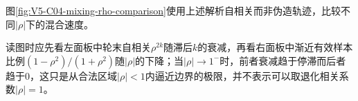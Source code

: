 \documentclass[UTF8,a4paper,11pt,openany]{ctexbook}
\begin{document}
\setcounter{page}{671}
\setcounter{chapter}{33}
\setcounter{figure}{6}
\pagestyle{headings}
图\ref{fig:V5-C04-mixing-rho-comparison}使用上述解析自相关而非伪造轨迹，比较不同$|\rho|$下的混合速度。

\FloatBarrier
读图时应先看左面板中轮末自相关$\rho^{2k}$随滞后$k$的衰减，再看右面板中渐近有效样本比例$(1-\rho^2)/(1+\rho^2)$随$|\rho|$的下降；当$|\rho|\to1^-$时，前者衰减趋于停滞而后者趋于$0$，这只是从合法区域$|\rho|<1$内逼近边界的极限，并不表示可以取退化相关系数$|\rho|=1$。
\end{document}
